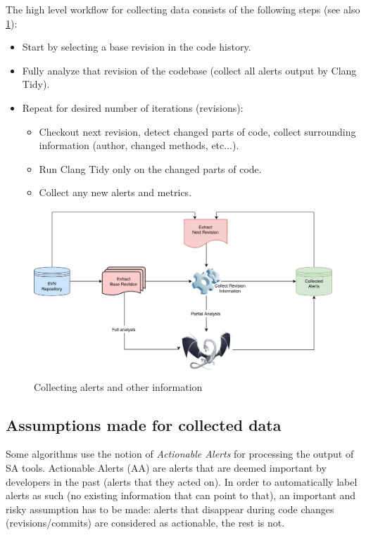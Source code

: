 The high level workflow for collecting data consists of the following steps (see also \cref{data_workflow}):
\begin{itemize}
	\item Start by selecting a base revision in the code history.
	\item Fully analyze that revision of the codebase (collect all alerts output by Clang Tidy).
	\item Repeat for desired number of iterations (revisions):
	\begin{itemize}
		\item Checkout next revision, detect changed parts of code, collect surrounding information (author, changed methods, etc...).
		\item Run Clang Tidy only on the changed parts of code.
		\item Collect any new alerts and metrics.
	\end{itemize} 
\end{itemize}


\begin{figure}[H]
	\centering
	\includegraphics[scale=0.2]{./src/collect_info.png}
	\caption{Collecting alerts and other information}
	\label{data_workflow}
\end{figure}

\subsection{Assumptions made for collected data}
\label{data_assumptions}

Some algorithms use the notion of \textit{Actionable Alerts} for processing the output of SA tools. Actionable Alerts (AA) are alerts that are deemed important by developers in the past (alerts that they acted on). In order to automatically label alerts as such (no existing information that can point to that), an important and risky assumption has to be made: alerts that disappear during code changes (revisions/commits) are considered as actionable, the rest is not. 

